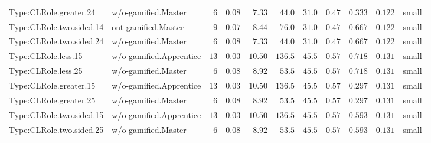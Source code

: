 \documentclass[6pt,a4paper]{article}
\begin{document}
{\begin{longtable}{llrrrrrrrrl}
Type:CLRole.greater.24&w/o-gamified.Master&$ 6$&$ 0.08$&$ 7.33$&$ 44.0$&$ 31.0$&$ 0.47$&$0.333$&$0.122$&small\tabularnewline
Type:CLRole.two.sided.14&ont-gamified.Master&$ 9$&$ 0.07$&$ 8.44$&$ 76.0$&$ 31.0$&$ 0.47$&$0.667$&$0.122$&small\tabularnewline
Type:CLRole.two.sided.24&w/o-gamified.Master&$ 6$&$ 0.08$&$ 7.33$&$ 44.0$&$ 31.0$&$ 0.47$&$0.667$&$0.122$&small\tabularnewline
Type:CLRole.less.15&w/o-gamified.Apprentice&$13$&$ 0.03$&$10.50$&$136.5$&$ 45.5$&$ 0.57$&$0.718$&$0.131$&small\tabularnewline
Type:CLRole.less.25&w/o-gamified.Master&$ 6$&$ 0.08$&$ 8.92$&$ 53.5$&$ 45.5$&$ 0.57$&$0.718$&$0.131$&small\tabularnewline
Type:CLRole.greater.15&w/o-gamified.Apprentice&$13$&$ 0.03$&$10.50$&$136.5$&$ 45.5$&$ 0.57$&$0.297$&$0.131$&small\tabularnewline
Type:CLRole.greater.25&w/o-gamified.Master&$ 6$&$ 0.08$&$ 8.92$&$ 53.5$&$ 45.5$&$ 0.57$&$0.297$&$0.131$&small\tabularnewline
\newpage
Type:CLRole.two.sided.15&w/o-gamified.Apprentice&$13$&$ 0.03$&$10.50$&$136.5$&$ 45.5$&$ 0.57$&$0.593$&$0.131$&small\tabularnewline
Type:CLRole.two.sided.25&w/o-gamified.Master&$ 6$&$ 0.08$&$ 8.92$&$ 53.5$&$ 45.5$&$ 0.57$&$0.593$&$0.131$&small\tabularnewline
\hline
\end{longtable}}
\end{document}
